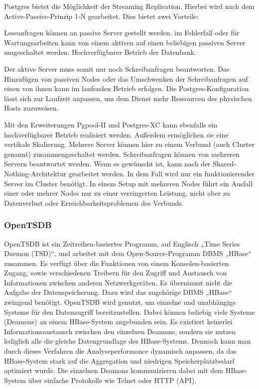Postgres bietet die Möglichkeit der \gls{Streaming Replication}. Hierbei wird
nach dem \gls{Active-Passive-Prinzip} 1-N gearbeitet. Dies bietet zwei
Vorteile:

\begin{outline}
  \1 Leseanfragen können an passive Server gestellt werden.
  \1 im Fehlerfall oder für Wartungsarbeiten kann von einem aktiven auf einen
  beliebigen passiven Server umgeschaltet werden.
  \1 Hochverfügbarer Betrieb der Datenbank.
\end{outline}

Der aktive Server muss somit nur noch Schreibanfragen beantworten. Das
Hinzufügen von passiven Nodes oder das Umschwenken der Schreibanfragen auf
einen von ihnen kann im laufenden Betrieb erfolgen. Die Postgres-Konfiguration
lässt sich zur Laufzeit anpassen, um dem Dienst mehr Ressourcen des physischen
Hosts zuzuweisen.

Mit den Erweiterungen \gls{Pgpool-II} und \gls{Postgres-XC} kann ebenfalls ein
hochverfügbarer Betrieb realisiert werden. Außerdem ermöglichen sie eine
vertikale \gls{Skalierung}. Mehrere Server können hier zu einem Verbund (auch
Cluster genannt) zusammengeschaltet werden. Schreibanfragen können von mehreren
Servern beantwortet werden. Wenn es gewünscht ist, kann nach der
\gls{Shared-Nothing-Architektur} gearbeitet werden. In dem Fall wird nur ein
funktionierender Server im Cluster benötigt. In einem Setup mit mehreren Nodes
führt ein Ausfall einer oder mehrer Nodes nur zu einer verringerten Leistung,
nicht aber zu Datenverlust oder Erreichbarkeitsproblemen des Verbunds.
\tm%

\subsubsection{OpenTSDB}
\label{subsubsec:opentsdb}
OpenTSDB ist ein Zeitreihen-basiertes Programm, auf Englisch „Time Series
Daemon (TSD)“, und arbeitet mit dem Open-Source-Programm \gls{DBMS} „HBase“
zusammen. Es verfügt über die Funktionen von einem Konsolen-basierten Zugang,
sowie verschiedenen Treibern für den Zugriff und Austausch von Informationen
zwischen anderen Netzwerkgeräten. Es übernimmt nicht die Aufgabe der
Datenspeicherung. Dazu wird das zugehörige \gls{DBMS} „HBase“ zwingend
benötigt. OpenTSDB wird genutzt, um einzelne und unabhängige Systeme für den
Datenzugriff bereitzustellen. Dabei können beliebig viele Systeme (Deamons) an
einem HBase-System angebunden sein. Es existiert keinerlei
Informationsaustausch zwischen den einzelnen Deamons, sondern sie nutzen
lediglich alle die gleiche Datengrundlage des HBase-Systems. Dennoch kann man
durch dieses Verfahren die Analyseperformance dynamisch anpassen, da das
HBase-System stark auf die Aggregation und niedrigen Speicherplatzbedarf
optimiert wurde. Die einzelnen Deamons kommunizieren dabei mit dem HBase-System
über einfache Protokolle wie Telnet oder HTTP (API).

